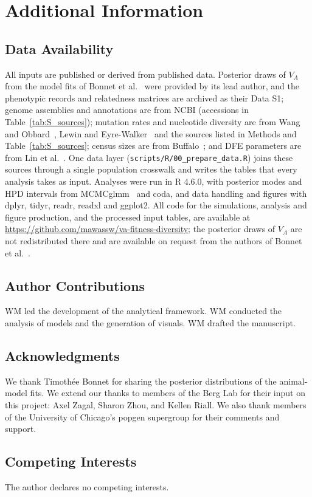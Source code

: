 \documentclass{article}
\begin{document}
    \linenumbers
\fi

\section*{Additional Information}
\subsection*{Data Availability}
All inputs are published or derived from published data. Posterior draws of $V_A$ from the model fits of Bonnet et al.~\cite{bonnet2022} were provided by its lead author, and the phenotypic records and relatedness matrices are archived as their Data S1; genome assemblies and annotations are from NCBI (accessions in Table~\ref{tab:S_sources}); mutation rates and nucleotide diversity are from Wang and Obbard~\cite{wangobbard2023}, Lewin and Eyre-Walker~\cite{lewin2026} and the sources listed in Methods and Table~\ref{tab:S_sources}; census sizes are from Buffalo~\cite{buffalo2021}; and DFE parameters are from Lin et al.~\cite{lin2026}. One data layer (\texttt{scripts/R/00\_prepare\_data.R}) joins these sources through a single population crosswalk and writes the tables that every analysis takes as input. Analyses were run in R 4.6.0, with posterior modes and HPD intervals from MCMCglmm~\cite{hadfield2010} and coda, and data handling and figures with dplyr, tidyr, readr, readxl and ggplot2. All code for the simulations, analysis and figure production, and the processed input tables, are available at \url{https://github.com/mawassw/va-fitness-diversity}; the posterior draws of $V_A$ are not redistributed there and are available on request from the authors of Bonnet et al.~\cite{bonnet2022}.
\subsection*{Author Contributions}
WM led the development of the analytical framework. WM conducted the analysis of models and the generation of visuals. WM drafted the manuscript. 
\subsection*{Acknowledgments}
We thank Timoth\'ee Bonnet for sharing the posterior distributions of the animal-model fits. We extend our thanks to members of the Berg Lab for their input on this project: Axel Zagal, Sharon Zhou, and Kellen Riall. We also thank members of the University of Chicago's popgen supergroup for their comments and support.
\subsection*{Competing Interests}
The author declares no competing interests.

\ifdefined\isMainDocument
\else
    \printbibliography
    
\end{document}
